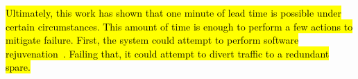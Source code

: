 \hl{Ultimately, this work has shown that one minute of lead time is possible
under certain circumstances.  This amount of time is enough to perform a few
actions to mitigate failure.  First, the system could attempt to perform
software rejuvenation~\cite{candea2004microreboot}.  Failing that, it could
attempt to divert traffic to a redundant spare.}
